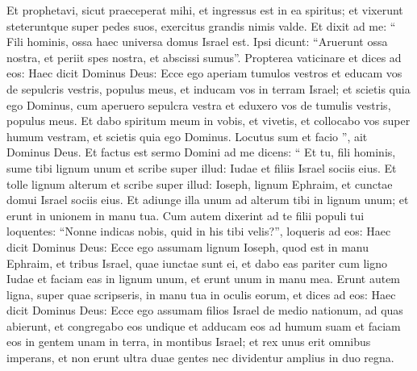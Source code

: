 \begin{biblechapter}
\begin{biblechapter}
\begin{biblechapter}
\begin{biblechapter}
\begin{biblechapter}
\begin{biblechapter}
\begin{biblechapter}
\begin{biblechapter}
\begin{biblechapter}
\begin{biblechapter}
\begin{biblechapter}
\begin{biblechapter}
\begin{biblechapter}
\begin{biblechapter}
\begin{biblechapter}
\begin{biblechapter}
\begin{biblechapter}
\begin{biblechapter}
\begin{biblechapter}
\begin{biblechapter}
\begin{biblechapter}
\begin{biblechapter}
\begin{biblechapter}
\begin{biblechapter}
\begin{biblechapter}
\begin{biblechapter}
\begin{biblechapter}
\begin{biblechapter}
\begin{biblechapter}
\begin{biblechapter}
\begin{biblechapter}
\begin{biblechapter}
\begin{biblechapter}
\begin{biblechapter}
\begin{biblechapter}
\begin{biblechapter}
\begin{biblechapter}
\verse Et prophetavi, sicut praeceperat mihi, et ingressus est in ea spiritus; et vixerunt steteruntque super pedes suos, exercitus grandis nimis valde.
 \verse Et dixit ad me: “ Fili hominis, ossa haec universa domus Israel est. Ipsi dicunt: “Aruerunt ossa nostra, et periit spes nostra, et abscissi sumus”. 
\verse Propterea vaticinare et dices ad eos: Haec dicit Dominus Deus: Ecce ego aperiam tumulos vestros et educam vos de sepulcris vestris, populus meus, et inducam vos in terram Israel; 
\verse et scietis quia ego Dominus, cum aperuero sepulcra vestra et eduxero vos de tumulis vestris, populus meus. 
\verse Et dabo spiritum meum in vobis, et vivetis, et collocabo vos super humum vestram, et scietis quia ego Dominus. Locutus sum et facio ”, ait Dominus Deus.
 \verse Et factus est sermo Domini ad me dicens: 
\verse “ Et tu, fili hominis, sume tibi lignum unum et scribe super illud: Iudae et filiis Israel sociis eius. Et tolle lignum alterum et scribe super illud: Ioseph, lignum Ephraim, et cunctae domui Israel sociis eius. 
\verse Et adiunge illa unum ad alterum tibi in lignum unum; et erunt in unionem in manu tua. 
\verse Cum autem dixerint ad te filii populi tui loquentes: “Nonne indicas nobis, quid in his tibi velis?”, 
\verse loqueris ad eos: Haec dicit Dominus Deus: Ecce ego assumam lignum Ioseph, quod est in manu Ephraim, et tribus Israel, quae iunctae sunt ei, et dabo eas pariter cum ligno Iudae et faciam eas in lignum unum, et erunt unum in manu mea. 
\verse Erunt autem ligna, super quae scripseris, in manu tua in oculis eorum, 
\verse et dices ad eos: Haec dicit Dominus Deus: Ecce ego assumam filios Israel de medio nationum, ad quas abierunt, et congregabo eos undique et adducam eos ad humum suam 
\verse et faciam eos in gentem unam in terra, in montibus Israel; et rex unus erit omnibus imperans, et non erunt ultra duae gentes nec dividentur amplius in duo regna. 

\end{biblechapter}
\end{biblechapter}
\end{biblechapter}
\end{biblechapter}
\end{biblechapter}
\end{biblechapter}
\end{biblechapter}
\end{biblechapter}
\end{biblechapter}
\end{biblechapter}
\end{biblechapter}
\end{biblechapter}
\end{biblechapter}
\end{biblechapter}
\end{biblechapter}
\end{biblechapter}
\end{biblechapter}
\end{biblechapter}
\end{biblechapter}
\end{biblechapter}
\end{biblechapter}
\end{biblechapter}
\end{biblechapter}
\end{biblechapter}
\end{biblechapter}
\end{biblechapter}
\end{biblechapter}
\end{biblechapter}
\end{biblechapter}
\end{biblechapter}
\end{biblechapter}
\end{biblechapter}
\end{biblechapter}
\end{biblechapter}
\end{biblechapter}
\end{biblechapter}
\end{biblechapter}
